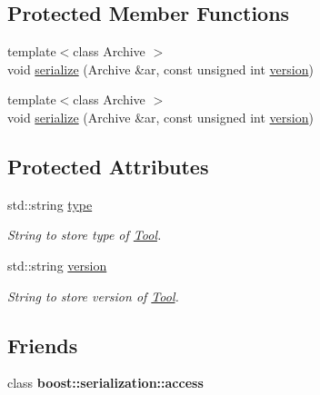 \subsection*{Protected Member Functions}
\begin{DoxyCompactItemize}
\item 
{\footnotesize template$<$class Archive $>$ }\\void \hyperlink{classSerialisableObject_a7c9ec7bf87b5921957768f4467c6143a}{serialize} (Archive \&ar, const unsigned int \hyperlink{classSerialisableObject_ade0071c238a09193b37a2750d2b50b18}{version})
\item 
{\footnotesize template$<$class Archive $>$ }\\void \hyperlink{classSerialisableObject_a7c9ec7bf87b5921957768f4467c6143a}{serialize} (Archive \&ar, const unsigned int \hyperlink{classSerialisableObject_ade0071c238a09193b37a2750d2b50b18}{version})
\end{DoxyCompactItemize}
\subsection*{Protected Attributes}
\begin{DoxyCompactItemize}
\item 
\hypertarget{classSerialisableObject_a893f965e41ad7f09b4066cb07fecef8e}{std\-::string \hyperlink{classSerialisableObject_a893f965e41ad7f09b4066cb07fecef8e}{type}}\label{classSerialisableObject_a893f965e41ad7f09b4066cb07fecef8e}

\begin{DoxyCompactList}\small\item\em String to store type of \hyperlink{classTool}{Tool}. \end{DoxyCompactList}\item 
\hypertarget{classSerialisableObject_ade0071c238a09193b37a2750d2b50b18}{std\-::string \hyperlink{classSerialisableObject_ade0071c238a09193b37a2750d2b50b18}{version}}\label{classSerialisableObject_ade0071c238a09193b37a2750d2b50b18}

\begin{DoxyCompactList}\small\item\em String to store version of \hyperlink{classTool}{Tool}. \end{DoxyCompactList}\end{DoxyCompactItemize}
\subsection*{Friends}
\begin{DoxyCompactItemize}
\item 
\hypertarget{classSerialisableObject_a4305f269960e8ccc92b19b2f0480b16d}{class {\bfseries boost\-::serialization\-::access}}\label{classSerialisableObject_a4305f269960e8ccc92b19b2f0480b16d}

\end{DoxyCompactItemize}


